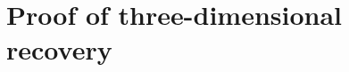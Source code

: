 




































































































\section{Proof of three-dimensional recovery} \label{sec-proofs-three-d}

